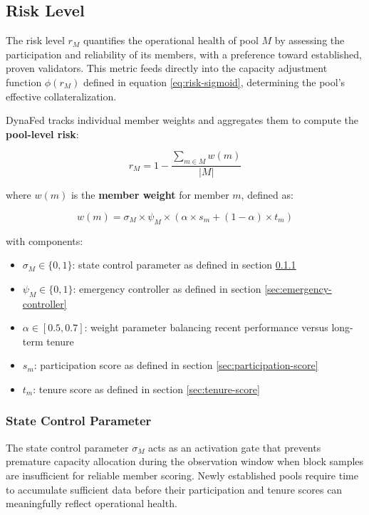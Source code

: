 \subsection{Risk Level}
\label{sec:risk-level-calculation}

The risk level $r_M$ quantifies the operational health of pool $M$ by assessing the participation and reliability of its members, with a preference toward established, proven validators. This metric feeds directly into the capacity adjustment function $\phi(r_M)$ defined in equation \ref{eq:risk-sigmoid}, determining the pool's effective collateralization.

DynaFed tracks individual member weights and aggregates them to compute the \textbf{pool-level risk}:

\begin{equation}
    \label{eq:aggr-risk-level}
    r_M = 1 - \frac{\sum_{m \in M} w(m)}{|M|}
\end{equation}

where $w(m)$ is the \textbf{member weight} for member $m$, defined as:

\begin{equation}
    w(m) = \sigma_M \times \psi_M \times \left(\alpha \times s_m + (1-\alpha) \times t_m\right)
\end{equation}

with components:
\begin{itemize}
    \item $\sigma_M \in \{0, 1\}$: state control parameter as defined in section \ref{sec:state-control-parameter}
    \item $\psi_M \in \{0, 1\}$: emergency controller as defined in section \ref{sec:emergency-controller}
    \item $\alpha \in [0.5, 0.7]$: weight parameter balancing recent performance versus long-term tenure
    \item $s_m$: participation score as defined in section \ref{sec:participation-score}
    \item $t_m$: tenure score as defined in section \ref{sec:tenure-score}
\end{itemize}

\subsubsection{State Control Parameter}
\label{sec:state-control-parameter}

The state control parameter $\sigma_M$ acts as an activation gate that prevents premature capacity allocation during the observation window when block samples are insufficient for reliable member scoring. Newly established pools require time to accumulate sufficient data before their participation and tenure scores can meaningfully reflect operational health.

